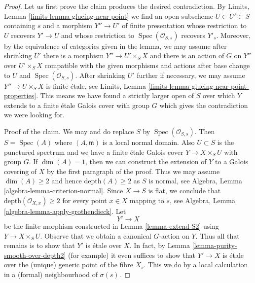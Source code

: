 \documentclass{stacks-project}
\theoremstyle{plain}
\theoremstyle{definition}
\theoremstyle{remark}
\numberwithin{equation}{subsection}
\def\Spec{\mathop{\mathrm{Spec}}}
\begin{document}
\begin{proof}
\medskip\noindent
Let us first prove the claim produces the desired contradiction.
By Limits, Lemma \ref{limits-lemma-glueing-near-point}
we find an open subscheme $U \subset U' \subset S$
containing $s$ and a morphism $Y'' \to U'$ of finite presentation
whose restriction to $U$ recovers $Y' \to U$ and
whose restriction to $\Spec(\mathcal{O}_{S, s})$ recovers $Y'_s$.
Moreover, by the equivalence of categories given in the
lemma, we may assume after shrinking $U'$
there is a morphism $Y'' \to U' \times_S X$
and there is an action of $G$ on $Y''$ over $U' \times_S X$
compatible with the given morphisms and actions after base
change to $U$ and $\Spec(\mathcal{O}_{S, s})$.
After shrinking $U'$ further if necessary, we may
assume $Y'' \to U \times_S X$ is finite \'etale, see
Limits, Lemma \ref{limits-lemma-glueing-near-point-properties}.
This means we have found a strictly larger open of $S$ over which
$Y$ extends to a finite \'etale Galois cover with group $G$
which gives the contradiction we were looking for.

\medskip\noindent
Proof of the claim. We may and do replace $S$ by $\Spec(\mathcal{O}_{S, s})$.
Then $S = \Spec(A)$ where $(A, \mathfrak m)$ is a local normal domain.
Also $U \subset S$ is the punctured spectrum and we have a finite
\'etale Galois cover $Y \to X \times_S U$ with group $G$.
If $\dim(A) = 1$, then we can construct the extension of $Y$ to
a Galois covering of $X$ by the first paragraph of the proof.
Thus we may assume $\dim(A) \geq 2$ and hence $\text{depth}(A) \geq 2$
as $S$ is normal, see Algebra, Lemma \ref{algebra-lemma-criterion-normal}.
Since $X \to S$ is flat, we conclude that
$\text{depth}(\mathcal{O}_{X, x}) \geq 2$ for every point $x \in X$
mapping to $s$, see
Algebra, Lemma \ref{algebra-lemma-apply-grothendieck}.
Let
$$
Y' \longrightarrow X
$$
be the finite morphism constructed in Lemma \ref{lemma-extend-S2}
using $Y \to X \times_S U$. Observe that we obtain a canonical
$G$-action on $Y$. Thus all that remains is to show that $Y'$
is \'etale over $X$. In fact, by
Lemma \ref{lemma-purity-smooth-over-depth2} (for example)
it even suffices to show that $Y' \to X$ is \'etale over the
(unique) generic point of the fibre $X_s$. This we do by
a local calculation in a (formal) neighbourhood of $\sigma(s)$.


\end{proof}
\end{document}

